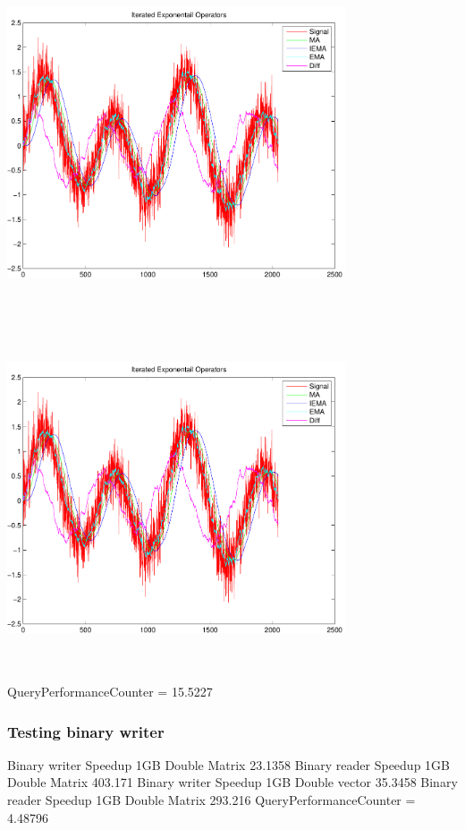 \documentclass[9pt]{article}
\theoremstyle{plain}
\theoremstyle{definition}
\theoremstyle{remark}
\numberwithin{equation}{section}
\begin{document}
\includegraphics[width=10.0cm,height=10.0cm]{IteratedExponentailOperators.pdf}

\includegraphics[width=10.0cm,height=10.0cm]{IteratedExponentailOperators.pdf}

QueryPerformanceCounter  =  15.5227
\subsubsection{Testing binary writer}
Binary writer Speedup 1GB Double Matrix 23.1358
Binary reader Speedup 1GB Double Matrix 403.171
Binary writer Speedup 1GB Double vector 35.3458
Binary reader Speedup 1GB Double Matrix 293.216
QueryPerformanceCounter  =  4.48796
\end{document}
